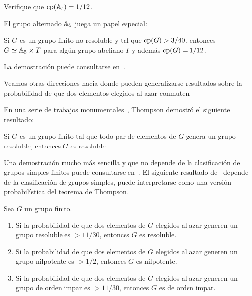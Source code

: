 \begin{exercise}
Verifique que $\operatorname{cp}(\mathbb{A}_5)=1/12$. 
\end{exercise}

El grupo alternado $\mathbb{A}_5$ juega un papel especial:

\begin{theorem}
Si $G$ es un grupo finito no resoluble y tal que $\operatorname{cp}(G)>3/40$, entonces $G\simeq\mathbb{A}_5\times T$ para algún grupo
abeliano $T$ y además $\operatorname{cp}(G)=1/12$. 
\end{theorem}

La demostración puede consultarse en~\cite{MR2228209}.

Veamos otras direcciones hacia donde pueden generalizarse resultados sobre la probabilidad de que dos elementos elegidos al azar conmuten.

En una serie de trabajos monumentales~\cite{MR230809,MR276325,MR313378,MR369512}, 
Thompson demostró el siguiente resultado:

\begin{theorem}[Thompson]
Si $G$ es un grupo finito tal que todo par de elementos de $G$ genera un grupo resoluble, entonces
$G$ es resoluble. 
\end{theorem}

Una demostración mucho más sencilla y que no depende de la clasificación de grupos simples finitos puede consultarse en~\cite{MR1346207}.
El siguiente resultado 
de~\cite{MR1770615} depende de la clasificación de grupos simples, puede 
interpretarse como una versión probabilística del teorema de Thompson.

\begin{theorem}
Sea $G$ un grupo finito. 
\begin{enumerate}
    \item Si la probabilidad de que dos elementos de $G$ elegidos al azar generen un grupo resoluble es $>11/30$, entonces $G$ es resoluble. 
    \item Si la probabilidad de que dos elementos de $G$ elegidos al azar generen un grupo nilpotente es $>1/2$, entonces $G$ es nilpotente.
    \item Si la probabilidad de que dos elementos de $G$ elegidos al azar generen un grupo de orden impar es $>11/30$, entonces $G$ es de orden impar.
\end{enumerate}
\end{theorem}

